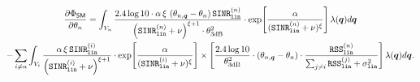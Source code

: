 \begin{figure*}[t!]
    \begin{multline}\label{gradient-vector-theta-SM-equation}
    \frac{\partial \Phi_{{\sf SM}}}{\partial \theta_n} =   \int_{V_n }  \frac{2.4 \log 10 \cdot \alpha \, \xi \,\left(\theta_{n,\bm{q}} - \theta_n \right) \mathtt{SINR}^{(n)}_{\mathtt{lin}} }{\left(\mathtt{SINR}^{(n)}_{\mathtt{lin}} + \nu\right)^{\xi+1} \cdot \theta^2_{\text{3dB}}} 
    \cdot \exp \! \left[ \frac{\alpha}{(\mathtt{SINR}^{(n)}_{\mathtt{lin}} + \nu )^{\xi}}\right]   \lambda(\bm{q})d\bm{q}   \\
    - \sum_{i\neq n}   \int_{V_i }  \frac{\alpha \, \xi \, \mathtt{SINR}^{(i)}_{\mathtt{lin}}}{\left(\mathtt{SINR}^{(i)}_{\mathtt{lin}} + \nu\right)^{\xi+1}} 
    \cdot \exp \! \left[ \frac{\alpha}{(\mathtt{SINR}^{(i)}_{\mathtt{lin}} + \nu )^{\xi}}\right] \times  
    \left[ \frac{2.4 \log 10}{\theta^2_{\text{3dB}}} \cdot \left(\theta_{n,\bm{q}} - \theta_n \right) \cdot {\frac{\mathtt{RSS}^{(n)}_{\mathtt{lin}}}{\sum_{j\neq i}^{} \mathtt{RSS}^{(j)}_{\mathtt{lin}} + \sigma^2_{\mathtt{lin}}}} \right]   \lambda(\bm{q})d\bm{q}.    
\end{multline}
\end{figure*}








